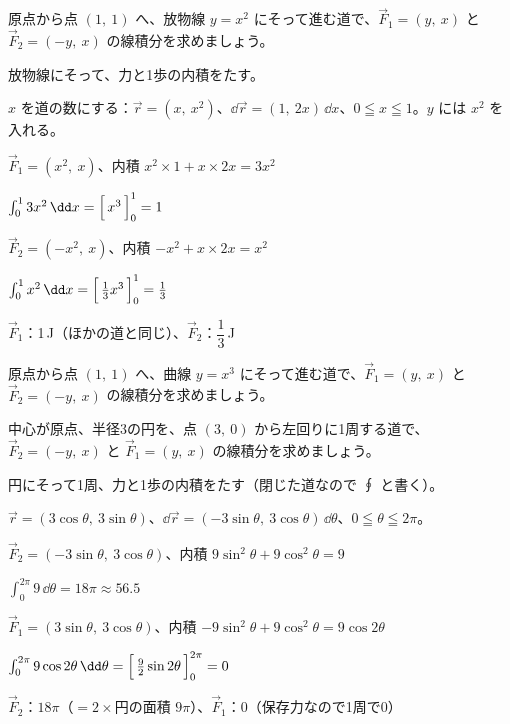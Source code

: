 \begin{reidai}[放物線の道]
原点から点 $(1,\ 1)$ へ、放物線 $y=x^2$ にそって進む道で、$\vec F_1=(y,\ x)$ と $\vec F_2=(-y,\ x)$ の線積分を求めましょう。\par
\kangaekata {}\par
{}\enspace 放物線にそって、力と1歩の内積をたす。\par
{}\enspace $x$ を道の数にする：$\vec r=(x,\ x^2)$、$\dd\vec r=(1,\ 2x)\,\dd x$、$0\leqq x\leqq1$。$y$ には $x^2$ を入れる。\par
\shiki\kviiihs{}\zw{} $\vec F_1=(x^2,\ x)$、内積 $x^2\times1+x\times2x=3x^2$\par
\kviiiha $\int_0^1 3x^2\,\dd x=\Bigl[\,x^3\,\Bigr]_0^1=1$\par
\kviiiha $\vec F_2=(-x^2,\ x)$、内積 $-x^2+x\times2x=x^2$\par
\kviiiha $\int_0^1 x^2\,\dd x=\Bigl[\,\frac{1}{3}x^3\,\Bigr]_0^1=\frac{1}{3}$\par
\kotae $\vec F_1$：1\,J（ほかの道と同じ）、$\vec F_2$：$\dfrac{1}{3}$\,J
\end{reidai}

\begin{jibun}
原点から点 $(1,\ 1)$ へ、曲線 $y=x^3$ にそって進む道で、$\vec F_1=(y,\ x)$ と $\vec F_2=(-y,\ x)$ の線積分を求めましょう。
\end{jibun}

\begin{reidai}[円を1周する道]
中心が原点、半径3の円を、点 $(3,\ 0)$ から左回りに1周する道で、$\vec F_2=(-y,\ x)$ と $\vec F_1=(y,\ x)$ の線積分を求めましょう。\par
\kangaekata {}\par
{}\enspace 円にそって1周、力と1歩の内積をたす（閉じた道なので ∮ と書く）。\par
{}\enspace $\vec r=(3\cos\theta,\ 3\sin\theta)$、$\dd\vec r=(-3\sin\theta,\ 3\cos\theta)\,\dd\theta$、$0\leqq\theta\leqq2\pi$。\par
\shiki\kviiihs{}\zw{} $\vec F_2=(-3\sin\theta,\ 3\cos\theta)$、内積 $9\sin^2\theta+9\cos^2\theta=9$\par
\kviiiha $\int_0^{2\pi}9\,\dd\theta=18\pi\approx56.5$\par
\kviiiha $\vec F_1=(3\sin\theta,\ 3\cos\theta)$、内積 $-9\sin^2\theta+9\cos^2\theta=9\cos2\theta$\par
\kviiiha $\int_0^{2\pi}9\cos2\theta\,\dd\theta=\Bigl[\,\frac{9}{2}\sin2\theta\,\Bigr]_0^{2\pi}=0$\par
\kotae $\vec F_2$：$18\pi$（$=2\times$円の面積 $9\pi$）、$\vec F_1$：0（保存力なので1周で0）
\end{reidai}

